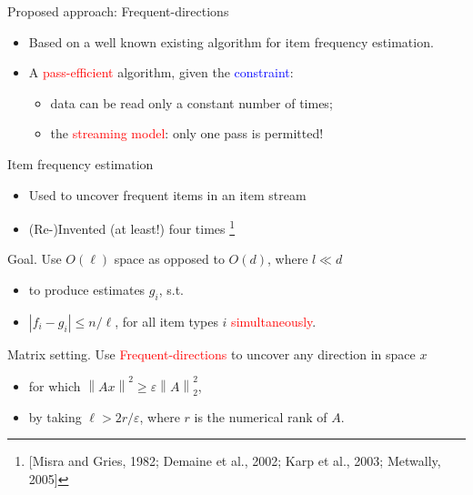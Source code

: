 \documentclass[first=dgreen,second=purple,logo=redque]{aaltoslides}
\newcommand{\vectornorm}[1]{\left\|#1\right\|}
\begin{document}
\begin{frame}[allowframebreaks=1]{Proposed approach: Frequent-directions}
\begin{itemize}
	\item Based on a well known existing algorithm for item frequency estimation.
	\item A \textcolor{red}{pass-efficient} algorithm, given the \textcolor{blue}{constraint}:
		\begin{itemize}
			\item data can be read only a \textcolor{dgreen}{constant} number of times;
			\item the \textcolor{red}{streaming model}: \textcolor{dgreen}{only one} pass is permitted!
		\end{itemize}


\end{itemize}
\end{frame}


\begin{frame}[allowframebreaks=1]{Item frequency estimation}
\begin{itemize}
    \item Used to uncover \textcolor{dgreen}{frequent} items in an item stream
    \item (Re-)Invented (at least!) four times \cite{Misra82, Demaine02, Karp03, Metwally05}\footnote{[Misra and Gries, 1982; Demaine et al., 2002; Karp et al., 2003; Metwally, 2005]}
\end{itemize}

\textcolor{dgreen}{Goal.} Use $O(\ell)$ space as opposed to $O(d)$, where $l \ll d$
\begin{itemize}
	\item to produce estimates $g_{i}$, s.t.
	\item $|f_{i} - g_{i} | \leq n/\ell$, for all item types $i$ \textcolor{red}{simultaneously}.
\end{itemize}

\textcolor{dgreen}{Matrix setting.} Use \textcolor{red}{Frequent-directions} to uncover any direction in space $x$
\begin{itemize}
	\item for which $\vectornorm{Ax}^{2} \geq \varepsilon \vectornorm{A}_{2}^{2}$,
	\item by taking $\ell > 2r/\varepsilon$, where $r$ is the \textcolor{dgreen}{numerical rank} of $A$.
\end{itemize}

\end{frame}
\end{document}

